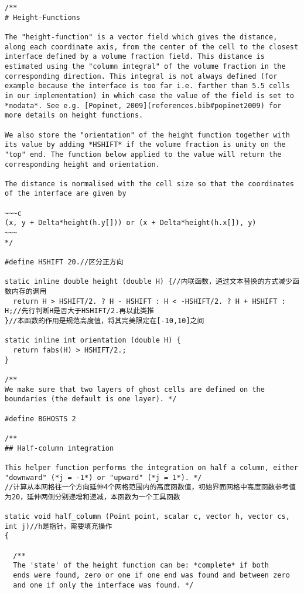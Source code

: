 \documentclass[lang=cn,11pt,a4paper]{elegantpaper}
\begin{document}
\begin{verbatim}
/**
# Height-Functions

The "height-function" is a vector field which gives the distance,
along each coordinate axis, from the center of the cell to the closest
interface defined by a volume fraction field. This distance is
estimated using the "column integral" of the volume fraction in the
corresponding direction. This integral is not always defined (for
example because the interface is too far i.e. farther than 5.5 cells
in our implementation) in which case the value of the field is set to
*nodata*. See e.g. [Popinet, 2009](references.bib#popinet2009) for
more details on height functions.

We also store the "orientation" of the height function together with
its value by adding *HSHIFT* if the volume fraction is unity on the
"top" end. The function below applied to the value will return the
corresponding height and orientation.

The distance is normalised with the cell size so that the coordinates
of the interface are given by

~~~c
(x, y + Delta*height(h.y[])) or (x + Delta*height(h.x[]), y)
~~~
*/

#define HSHIFT 20.//区分正方向

static inline double height (double H) {//内联函数，通过文本替换的方式减少函数内存的调用
  return H > HSHIFT/2. ? H - HSHIFT : H < -HSHIFT/2. ? H + HSHIFT : H;//先行判断H是否大于HSHIFT/2.再以此类推
}//本函数的作用是规范高度值，将其完美限定在[-10,10]之间

static inline int orientation (double H) {
  return fabs(H) > HSHIFT/2.;
}

/**
We make sure that two layers of ghost cells are defined on the
boundaries (the default is one layer). */

#define BGHOSTS 2

/**
## Half-column integration 

This helper function performs the integration on half a column, either
"downward" (*j = -1*) or "upward" (*j = 1*). */
//计算从本网格往一个方向延伸4个网格范围内的高度函数值，初始界面网格中高度函数参考值为20，延伸两侧分别递增和递减，本函数为一个工具函数

static void half_column (Point point, scalar c, vector h, vector cs, int j)//h是指针，需要填充操作
{

  /**
  The 'state' of the height function can be: *complete* if both
  ends were found, zero or one if one end was found and between zero
  and one if only the interface was found. */


\end{verbatim}
\end{document}
